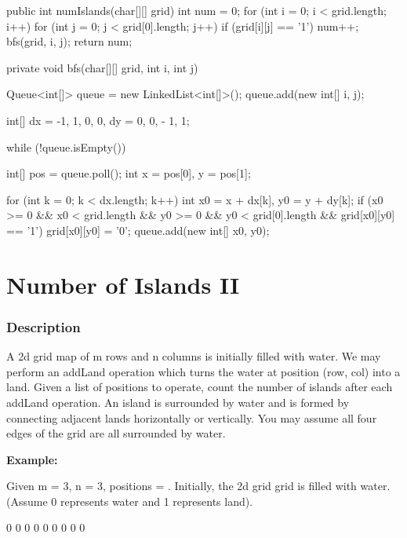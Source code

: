 \begin{Code}
public int numIslands(char[][] grid) {
    int num = 0;
    for (int i = 0; i < grid.length; i++) {
        for (int j = 0; j < grid[0].length; j++) {
            if (grid[i][j] == '1') {
                num++;
                bfs(grid, i, j);
            }
        }
    }
    return num;
}

private void bfs(char[][] grid, int i, int j) {
    Queue<int[]> queue = new LinkedList<int[]>();
    queue.add(new int[] {i, j});

    int[] dx = {-1, 1, 0, 0}, dy = {0, 0, - 1, 1};

    while (!queue.isEmpty()) {
        int[] pos = queue.poll();
        int x = pos[0], y = pos[1];

        for (int k = 0; k < dx.length; k++) {
            int x0 = x + dx[k], y0 = y + dy[k];
            if (x0 >= 0 && x0 < grid.length && y0 >= 0 && y0 < grid[0].length && grid[x0][y0] == '1') {
                grid[x0][y0] = '0';
                queue.add(new int[] {x0, y0});
            }
        }
    }
}
\end{Code}

\newpage

\section{Number of Islands II} %

\subsubsection{Description}

A 2d grid map of m rows and n columns is initially filled with water. We may perform an addLand operation which turns the water at position (row, col) into a land. Given a list of positions to operate, count the number of islands after each addLand operation. An island is surrounded by water and is formed by connecting adjacent lands horizontally or vertically. You may assume all four edges of the grid are all surrounded by water.

\textbf{Example:}

Given m = 3, n = 3, positions = \code{[[0,0], [0,1], [1,2], [2,1]]}.
Initially, the 2d grid grid is filled with water. (Assume 0 represents water and 1 represents land).

\begin{Code}
0 0 0
0 0 0
0 0 0
\end{Code}

